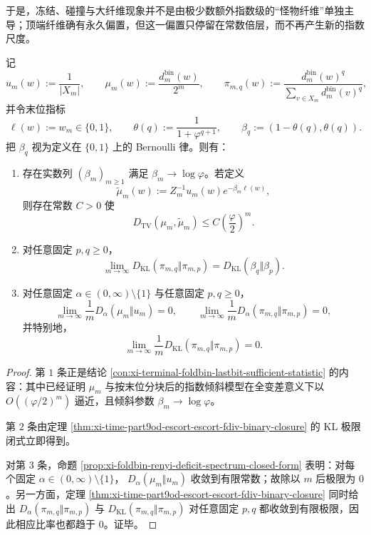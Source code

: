 \noindent
于是，冻结、碰撞与大纤维现象并不是由极少数额外指数级的“怪物纤维”单独主导；顶端纤维确有永久偏置，但这一偏置只停留在常数倍层，而不再产生新的指数尺度。

\begin{theorem}[固定温度信息几何的一位塌缩]\label{thm:conclusion-fold-onebit-information-geometry-collapse}
记
\[
u_m(w):=\frac1{|X_m|},
\qquad
\mu_m(w):=\frac{d_m^{\mathrm{bin}}(w)}{2^m},
\qquad
\pi_{m,q}(w):=\frac{d_m^{\mathrm{bin}}(w)^q}{\sum_{v\in X_m}d_m^{\mathrm{bin}}(v)^q},
\]
并令末位指标
\[
\ell(w):=w_m\in\{0,1\},
\qquad
\theta(q):=\frac{1}{1+\varphi^{q+1}},
\qquad
\beta_q:=(1-\theta(q),\theta(q)).
\]
把 \(\beta_q\) 视为定义在 \(\{0,1\}\) 上的 Bernoulli 律。则有：
\begin{enumerate}
  \item 存在实数列 \((\beta_m)_{m\ge 1}\) 满足 \(\beta_m\to\log\varphi\)。若定义
  \[
  \widetilde\mu_m(w):=Z_m^{-1}u_m(w)e^{-\beta_m\ell(w)},
  \]
  则存在常数 \(C>0\) 使
  \[
  D_{\mathrm{TV}}(\mu_m,\widetilde\mu_m)
  \le
  C\left(\frac{\varphi}{2}\right)^m.
  \]
  \item 对任意固定 \(p,q\ge 0\)，
  \[
  \lim_{m\to\infty}D_{\mathrm{KL}}(\pi_{m,q}\Vert \pi_{m,p})
  =
  D_{\mathrm{KL}}(\beta_q\Vert \beta_p).
  \]
  \item 对任意固定 \(\alpha\in(0,\infty)\setminus\{1\}\) 与任意固定 \(p,q\ge 0\)，
  \[
  \lim_{m\to\infty}\frac1m D_\alpha(\mu_m\Vert u_m)=0,
  \qquad
  \lim_{m\to\infty}\frac1m D_\alpha(\pi_{m,q}\Vert \pi_{m,p})=0,
  \]
  并特别地，
  \[
  \lim_{m\to\infty}\frac1m D_{\mathrm{KL}}(\pi_{m,q}\Vert \pi_{m,p})=0.
  \]
\end{enumerate}
\end{theorem}
\begin{proof}
第 \(1\) 条正是结论 \ref{con:xi-terminal-foldbin-lastbit-sufficient-statistic} 的内容：其中已经证明 \(\mu_m\) 与按末位分块后的指数倾斜模型在全变差意义下以
\(
O((\varphi/2)^m)
\)
逼近，且倾斜参数 \(\beta_m\to\log\varphi\)。

第 \(2\) 条由定理 \ref{thm:xi-time-part9od-escort-escort-fdiv-binary-closure} 的 KL 极限闭式立即得到。

对第 \(3\) 条，命题 \ref{prop:xi-foldbin-renyi-deficit-spectrum-closed-form} 表明：对每个固定
\(
\alpha\in(0,\infty)\setminus\{1\}
\)，
\(
D_\alpha(\mu_m\Vert u_m)
\)
收敛到有限常数；故除以 \(m\) 后极限为 \(0\)。另一方面，定理 \ref{thm:xi-time-part9od-escort-escort-fdiv-binary-closure} 同时给出
\(
D_\alpha(\pi_{m,q}\Vert \pi_{m,p})
\)
与
\(
D_{\mathrm{KL}}(\pi_{m,q}\Vert \pi_{m,p})
\)
对任意固定 \(p,q\) 都收敛到有限极限，因此相应比率也都趋于 \(0\)。证毕。
\end{proof}

